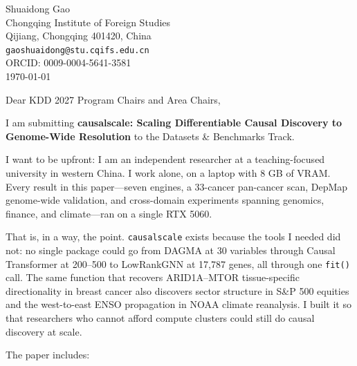 \documentclass[11pt]{article}
\begin{document}
\begin{flushright}
Shuaidong Gao \\
Chongqing Institute of Foreign Studies \\
Qijiang, Chongqing 401420, China \\
\texttt{gaoshuaidong@stu.cqifs.edu.cn} \\
ORCID: 0009-0004-5641-3581 \\
\today
\end{flushright}

\bigskip

\noindent Dear KDD 2027 Program Chairs and Area Chairs,

\medskip

I am submitting {\bf causalscale: Scaling Differentiable Causal Discovery to Genome-Wide Resolution} to the Datasets \& Benchmarks Track.

I want to be upfront: I am an independent researcher at a teaching-focused university in western China. I work alone, on a laptop with 8 GB of VRAM. Every result in this paper---seven engines, a 33-cancer pan-cancer scan, DepMap genome-wide validation, and cross-domain experiments spanning genomics, finance, and climate---ran on a single RTX 5060.

That is, in a way, the point. \texttt{causalscale} exists because the tools I needed did not: no single package could go from DAGMA at 30 variables through Causal Transformer at 200--500 to LowRankGNN at 17,787 genes, all through one \texttt{fit()} call. The same function that recovers ARID1A--MTOR tissue-specific directionality in breast cancer also discovers sector structure in S\&P 500 equities and the west-to-east ENSO propagation in NOAA climate reanalysis. I built it so that researchers who cannot afford compute clusters could still do causal discovery at scale.

The paper includes:
\end{document}
